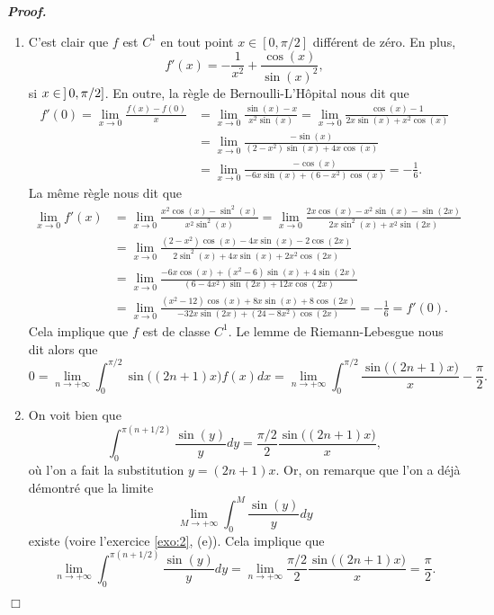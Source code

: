\documentclass[11pt,a4paper]{article}
\newenvironment{preuve}[1][]
{\vskip 2mm  \noindent\emph{\bf Proof#1. }}{$\Box$ \vskip 2mm}
\newcounter{exercice}
\begin{document}
\begin{preuve}
\begin{enumerate}
			\item C'est clair que $f$ est $C^{1}$ en tout point $x \in [0,\pi/2]$ différent de zéro. 
			En plus, 
			\[     f'(x) = -\frac{1 }{x^{2}} + \frac{\cos(x)}{ \sin (x)^{2}},     \]
			si $x \in \hskip 0.6mm ] \hskip 0.6mm 0, \pi/2]$.
			En outre, la règle de Bernoulli-L'H\^opital nous dit que
			\begin{align*}     
			f'(0) = \underset{x \rightarrow 0}{\lim} \frac{f(x) - f(0)}{x} 
			&= \underset{x \rightarrow 0}{\lim} \frac{\sin(x)-x}{x^{2} \sin(x)} 
			= \underset{x \rightarrow 0}{\lim} \frac{\cos(x)-1}{2x \sin(x) + x^{2} \cos(x)} 
			\\
			&= \underset{x \rightarrow 0}{\lim} \frac{- \sin(x)}{(2-x^{2}) \sin(x) + 4 x \cos(x)}
			\\
			&= \underset{x \rightarrow 0}{\lim} \frac{- \cos(x)}{-6x \sin(x) + (6- x^{2}) \cos(x)} = -\frac{1}{6}. 
			\end{align*}
			La même règle nous dit que 
			\begin{align*}     
			\underset{x \rightarrow 0}{\lim} f'(x) &= \underset{x \rightarrow 0}{\lim} \frac{x^{2}\cos(x)-\sin^{2}(x)}{x^{2} \sin^{2}(x)} 
			= \underset{x \rightarrow 0}{\lim} \frac{2 x \cos(x)-x^{2} \sin(x) - \sin(2x)}{2 x \sin^{2}(x) + x^{2} \sin(2x)}
			\\
			&= \underset{x \rightarrow 0}{\lim} \frac{(2 - x^{2}) \cos(x) - 4 x \sin(x) - 2 \cos(2x)}{2 \sin^{2}(x) + 4 x \sin(x) + 2 x^{2} \cos(2x)}
			\\
			&= \underset{x \rightarrow 0}{\lim} \frac{- 6 x \cos(x) + (x^{2} - 6) \sin(x) + 4 \sin(2x)}{(6 - 4 x^{2}) \sin(2 x) + 12 x \cos(2x)}
			\\
			&= \underset{x \rightarrow 0}{\lim} \frac{(x^{2} - 12) \cos(x) + 8 x \sin(x) + 8 \cos(2x)}{-32 x \sin(2 x) + (24 - 8 x^{2}) \cos(2x)} = -\frac{1}{6} = f'(0).
			\end{align*}
			Cela implique que $f$ est de classe $C^{1}$. 
			Le lemme de Riemann-Lebesgue nous dit alors que 
			\[     0 = \underset{n \rightarrow +\infty}{\lim} \int_0^{\pi/2} \sin\big((2n+1)x\big) f(x) dx 
			= \underset{n \rightarrow +\infty}{\lim} \int_0^{\pi/2} \frac{\sin \big((2n+1)x\big)}{x} - \frac{\pi }{ 2}.     \]
			
			\item 
			On voit bien que 
			\[     \int_0^{\pi (n + 1/2)} \frac{\sin (y)}{y}dy = \frac{\pi/2 }{ 2} \frac{\sin \big((2n+1)x\big)}{x},     \]
			où l'on a fait la substitution $y = (2n+1)x$. 
			Or, on remarque que l'on a déjà démontré que la limite 
			\[     \underset{M \rightarrow +\infty}{\lim}\int_0^{M} \frac{\sin (y)}{y}dy     \]
			existe (voire l'exercice \ref{exo:2}, (e)). 
			Cela implique que 
			\[     \underset{n \rightarrow +\infty}{\lim} \int_0^{\pi (n + 1/2)} \frac{\sin (y)}{y}dy = \underset{n \rightarrow +\infty}{\lim} \frac{\pi/2 }{ 2} \frac{\sin \big((2n+1)x\big)}{x} = \frac{\pi }{ 2}.     \]
			

\end{enumerate}
\end{preuve}
\end{document}
